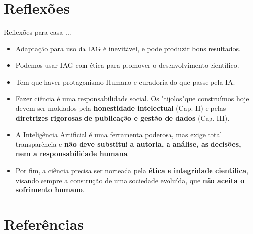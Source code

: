 \documentclass[aspectratio=169]{beamer}
\begin{document}
\section{Reflexões}

\begin{frame}[t]{Reflexões para casa ...}
    \footnotesize
    \begin{itemize}
        \item Adaptação para uso da IAG é inevitável, e pode produzir bons resultados.
        \item Podemos usar IAG com ética para promover o desenvolvimento científico.
        \item Tem que haver protagonismo Humano e curadoria do que passe pela IA.
    \end{itemize}
        \vspace{1}
    \begin{itemize}
        \item Fazer ciência é uma responsabilidade social. Os "tijolos"\space que construímos hoje devem ser moldados pela \textbf{honestidade intelectual} (Cap. II) e pelas \textbf{diretrizes rigorosas de publicação e gestão de dados} (Cap. III).
        \item A Inteligência Artificial é uma ferramenta poderosa, mas exige total transparência e \textbf{não deve substitui a autoria, a análise, as decisões, nem a responsabilidade humana}.
        \item Por fim, a ciência precisa ser norteada pela \textbf{ética e integridade científica}, visando sempre a construção de uma sociedade evoluída, que \textbf{não aceita o sofrimento humano}.
    \end{itemize}

\end{frame}

\section{Referências}
\end{document}
